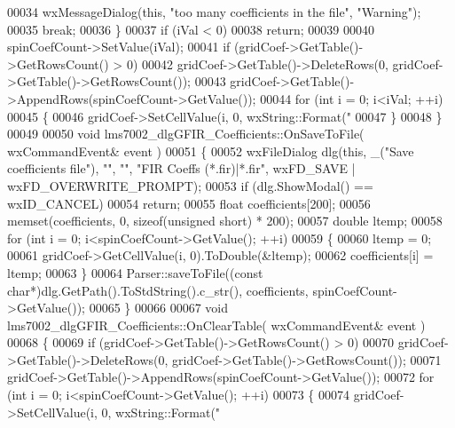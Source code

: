 \begin{DoxyCode}
00034         wxMessageDialog(\textcolor{keyword}{this}, \textcolor{stringliteral}{"too many coefficients in the file"}, \textcolor{stringliteral}{"Warning"});
00035         \textcolor{keywordflow}{break};
00036     \}
00037     \textcolor{keywordflow}{if} (iVal < 0)
00038         \textcolor{keywordflow}{return};
00039 
00040     spinCoefCount->SetValue(iVal);
00041     \textcolor{keywordflow}{if} (gridCoef->GetTable()->GetRowsCount() > 0)
00042         gridCoef->GetTable()->DeleteRows(0, gridCoef->GetTable()->GetRowsCount());
00043     gridCoef->GetTable()->AppendRows(spinCoefCount->GetValue());
00044     \textcolor{keywordflow}{for} (\textcolor{keywordtype}{int} i = 0; i<iVal; ++i)
00045     \{
00046         gridCoef->SetCellValue(i, 0, wxString::Format(\textcolor{stringliteral}{"%
00047     \}
00048 \}
00049 
00050 \textcolor{keywordtype}{void} lms7002_dlgGFIR_Coefficients::OnSaveToFile( wxCommandEvent& event )
00051 \{
00052     wxFileDialog dlg(\textcolor{keyword}{this}, \_(\textcolor{stringliteral}{"Save coefficients file"}), \textcolor{stringliteral}{""}, \textcolor{stringliteral}{""}, \textcolor{stringliteral}{"FIR Coeffs (*.fir)|*.fir"}, wxFD\_SAVE | 
      wxFD\_OVERWRITE\_PROMPT);
00053     \textcolor{keywordflow}{if} (dlg.ShowModal() == wxID\_CANCEL)
00054         \textcolor{keywordflow}{return};
00055     \textcolor{keywordtype}{float} coefficients[200];
00056     memset(coefficients, 0, \textcolor{keyword}{sizeof}(\textcolor{keywordtype}{unsigned} \textcolor{keywordtype}{short}) * 200);
00057     \textcolor{keywordtype}{double} ltemp;
00058     \textcolor{keywordflow}{for} (\textcolor{keywordtype}{int} i = 0; i<spinCoefCount->GetValue(); ++i)
00059     \{
00060         ltemp = 0;
00061         gridCoef->GetCellValue(i, 0).ToDouble(&ltemp);
00062         coefficients[i] = ltemp;
00063     \}
00064     Parser::saveToFile((\textcolor{keyword}{const} \textcolor{keywordtype}{char}*)dlg.GetPath().ToStdString().c\_str(), coefficients, 
      spinCoefCount->GetValue());
00065 \}
00066 
00067 \textcolor{keywordtype}{void} lms7002_dlgGFIR_Coefficients::OnClearTable( wxCommandEvent& event )
00068 \{
00069     \textcolor{keywordflow}{if} (gridCoef->GetTable()->GetRowsCount() > 0)
00070         gridCoef->GetTable()->DeleteRows(0, gridCoef->GetTable()->GetRowsCount());
00071     gridCoef->GetTable()->AppendRows(spinCoefCount->GetValue());
00072     \textcolor{keywordflow}{for} (\textcolor{keywordtype}{int} i = 0; i<spinCoefCount->GetValue(); ++i)
00073     \{
00074         gridCoef->SetCellValue(i, 0, wxString::Format(\textcolor{stringliteral}{"%
}}
\end{DoxyCode}
